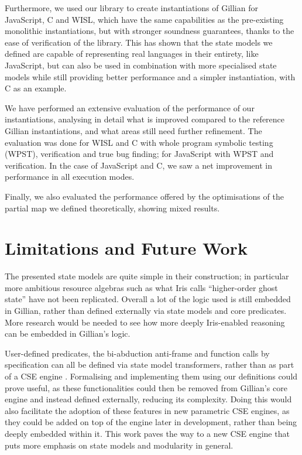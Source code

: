 Furthermore, we used our library to create instantiations of Gillian for JavaScript, C and WISL, which have the same capabilities as the pre-existing monolithic instantiations, but with stronger soundness guarantees, thanks to the ease of verification of the library. This has shown that the state models we defined are capable of representing real languages in their entirety, like JavaScript, but can also be used in combination with more specialised state models while still providing better performance and a simpler instantiation, with C as an example.

We have performed an extensive evaluation of the performance of our instantiations, analysing in detail what is improved compared to the reference Gillian instantiations, and what areas still need further refinement. The evaluation was done for WISL and C with whole program symbolic testing (WPST), verification and true bug finding; for JavaScript with WPST and verification. In the case of JavaScript and C, we saw a net improvement in performance in all execution modes.

Finally, we also evaluated the performance offered by the optimisations of the partial map we defined theoretically, showing mixed results.

\section{Limitations and Future Work}

The presented state models are quite simple in their construction; in particular more ambitious resource algebras such as what Iris calls ``higher-order ghost state'' \cite{iris} have not been replicated. Overall a lot of the logic used is still embedded in Gillian, rather than defined externally via state models and core predicates. More research would be needed to see how more deeply Iris-enabled reasoning can be embedded in Gillian's logic.

User-defined predicates, the bi-abduction anti-frame and function calls by specification can all be defined via state model transformers, rather than as part of a CSE engine \cite{sacha-phd}. Formalising and implementing them using our definitions could prove useful, as these functionalities could then be removed from Gillian's core engine and instead defined externally, reducing its complexity. Doing this would also facilitate the adoption of these features in new parametric CSE engines, as they could be added on top of the engine later in development, rather than being deeply embedded within it. This work paves the way to a new CSE engine that puts more emphasis on state models and modularity in general.

